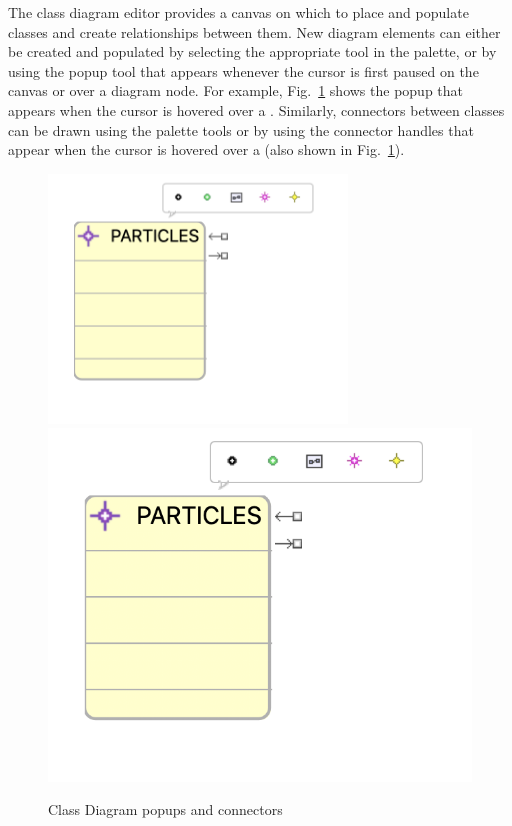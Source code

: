 \documentclass[a4paper,10pt]{article}
\begin{document}
The class diagram editor provides a canvas on which to place and populate classes and create relationships between them.
New diagram elements can either be created and populated by selecting the appropriate tool in the palette, or by using the popup tool that appears whenever the cursor is first paused on the canvas or over a diagram node. For example, Fig.~\ref{fig:CDpopups} shows the popup that appears when the cursor is hovered over a . 
Similarly, connectors between classes can be drawn using the palette tools or by using the connector handles that appear when the cursor is hovered over a  (also shown in Fig.~\ref{fig:CDpopups}).

	\begin{figure}[!htbp]
		\centering
		\ifplastex
		\includegraphics[width=300]{figures/popups.png}
		\else
		\includegraphics[width=.3\textwidth]{figures/popups.png}
		\fi
		\caption{Class Diagram popups and connectors}
		\label{fig:CDpopups}
	\end{figure}
\end{document}
